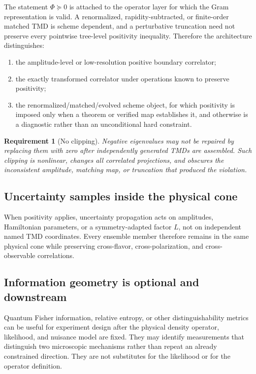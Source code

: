 \documentclass[11pt]{article}
\newtheorem{requirement}[definition]{Requirement}
\begin{document}
The statement \(\Phi\succeq0\) is attached to the operator layer for which
the Gram representation is valid.  A renormalized, rapidity-subtracted, or
finite-order matched TMD is scheme dependent, and a perturbative truncation
need not preserve every pointwise tree-level positivity inequality.
Therefore the architecture distinguishes:
\begin{enumerate}
\item the amplitude-level or low-resolution positive boundary correlator;
\item the exactly transformed correlator under operations known to preserve
positivity;
\item the renormalized/matched/evolved scheme object, for which positivity is
imposed only when a theorem or verified map establishes it, and otherwise is
a diagnostic rather than an unconditional hard constraint.
\end{enumerate}

\begin{requirement}[No clipping]
Negative eigenvalues may not be repaired by replacing them with zero after
independently generated TMDs are assembled.  Such clipping is nonlinear,
changes all correlated projections, and obscures the inconsistent amplitude,
matching map, or truncation that produced the violation.
\end{requirement}

\subsection{Uncertainty samples inside the physical cone}

When positivity applies, uncertainty propagation acts on amplitudes,
Hamiltonian parameters, or a symmetry-adapted factor \(L\), not on independent
named TMD coordinates.  Every ensemble member therefore remains in the same
physical cone while preserving cross-flavor, cross-polarization, and
cross-observable correlations.

\subsection{Information geometry is optional and downstream}

Quantum Fisher information, relative entropy, or other distinguishability
metrics can be useful for experiment design after the physical density
operator, likelihood, and nuisance model are fixed.  They may identify
measurements that distinguish two microscopic mechanisms rather than repeat
an already constrained direction.  They are not substitutes for the
likelihood or for the operator definition.
\end{document}

